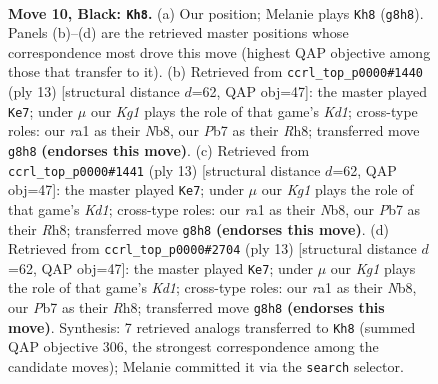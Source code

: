 \documentclass[11pt]{article}
\begin{document}
\clearpage

\begin{figure}[p]\centering
\begin{subfigure}{0.46\textwidth}\centering
\resizebox{\linewidth}{!}{%
\newchessgame
\chessboard[
  setfen={rnbr2k1/ppp1ppbp/1n4p1/4P3/2P4P/1B3N2/PP3PP1/RNB1K2R b KQ - 0 10},
  showmover=false,
  pgfstyle=straightmove, color=movearrow, markmove={g8-h8}
]}
\caption{}
\end{subfigure}\hfill
\begin{subfigure}{0.46\textwidth}\centering
\resizebox{\linewidth}{!}{%
\newchessgame
\chessboard[
  setfen={rnbk3r/ppp2ppp/3b1n2/4p3/2B1P3/2N2N2/PPP2PPP/R1B1K2R b KQ - 3 7},
  showmover=false,
  pgfstyle=straightmove, color=movearrow, markmove={d8-e7}
]}
\caption{}
\end{subfigure}
\\[4pt]
\begin{subfigure}{0.46\textwidth}\centering
\resizebox{\linewidth}{!}{%
\newchessgame
\chessboard[
  setfen={rnbk3r/ppp2ppp/3b1n2/4p3/2B1P3/2N2N2/PPP2PPP/R1B1K2R b KQ - 3 7},
  showmover=false,
  pgfstyle=straightmove, color=movearrow, markmove={d8-e7}
]}
\caption{}
\end{subfigure}\hfill
\begin{subfigure}{0.46\textwidth}\centering
\resizebox{\linewidth}{!}{%
\newchessgame
\chessboard[
  setfen={rnbk3r/ppp2ppp/3b1n2/4p3/2B1P3/2N2N2/PPP2PPP/R1B1K2R b KQ - 3 7},
  showmover=false,
  pgfstyle=straightmove, color=movearrow, markmove={d8-e7}
]}
\caption{}
\end{subfigure}
\caption{\textbf{Move 10, Black: \texttt{Kh8}.} (a) Our position; Melanie plays \texttt{Kh8} (\texttt{g8h8}). Panels (b)--(d) are the retrieved master positions whose correspondence most drove this move (highest QAP objective among those that transfer to it). (b) Retrieved from \texttt{ccrl\_top\_p0000\#1440} (ply 13) [structural distance $d$=62, QAP obj=47]: the master played \texttt{Ke7}; under $\mu$ our \emph{Kg1} plays the role of that game's \emph{Kd1}; cross-type roles: our \emph{r}a1 as their \emph{N}b8, our \emph{P}b7 as their \emph{R}h8; transferred move \texttt{g8h8} \textbf{(endorses this move)}. (c) Retrieved from \texttt{ccrl\_top\_p0000\#1441} (ply 13) [structural distance $d$=62, QAP obj=47]: the master played \texttt{Ke7}; under $\mu$ our \emph{Kg1} plays the role of that game's \emph{Kd1}; cross-type roles: our \emph{r}a1 as their \emph{N}b8, our \emph{P}b7 as their \emph{R}h8; transferred move \texttt{g8h8} \textbf{(endorses this move)}. (d) Retrieved from \texttt{ccrl\_top\_p0000\#2704} (ply 13) [structural distance $d$=62, QAP obj=47]: the master played \texttt{Ke7}; under $\mu$ our \emph{Kg1} plays the role of that game's \emph{Kd1}; cross-type roles: our \emph{r}a1 as their \emph{N}b8, our \emph{P}b7 as their \emph{R}h8; transferred move \texttt{g8h8} \textbf{(endorses this move)}. Synthesis: 7 retrieved analogs transferred to \texttt{Kh8} (summed QAP objective 306, the strongest correspondence among the candidate moves); Melanie committed it via the \texttt{search} selector.}
\label{fig:thought-m19}
\end{figure}
\end{document}
